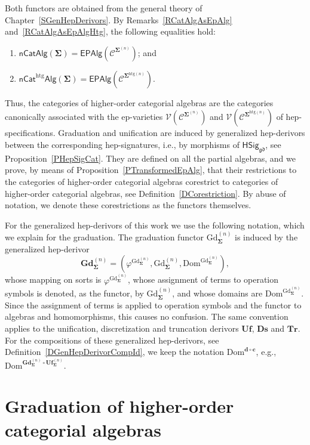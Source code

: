 \documentclass[a4paper, reqno]{amsbook}
\newcommand{\sig}[1]{\mathbf{#1}}             %
\newcommand{\spec}[1]{\boldsymbol{\mathcal{#1}}} %
\newcommand{\Dom}{\mathrm{Dom}}
\newcommand{\gd}{\mathfrak{gd}}              %
\newcommand{\htg}{\mathrm{htg}}                %
\newcommand{\Gd}{\mathrm{Gd}}
\newcommand{\bGd}{\mathbf{Gd}}
\newcommand{\bUf}{\mathbf{Uf}}
\newcommand{\bDs}{\mathbf{Ds}}
\newcommand{\bTr}{\mathbf{Tr}}
\theoremstyle{plain}
\theoremstyle{definition}
\begin{document}
Both functors are obtained from the general theory of Chapter~\ref{SGenHepDerivors}.
By Remarks~\ref{RCatAlgAsEpAlg} and~\ref{RCatAlgAsEpAlgHtg}, the following equalities hold:
\begin{enumerate}
	\item
	$\mathsf{nCatAlg}(\sig{\Sigma})=\mathsf{EPAlg}(\spec{C}^{\sig{\Sigma}^{(n)}})$; and

	\item
	$\mathsf{nCat}^{\htg}\mathsf{Alg}(\sig{\Sigma})=\mathsf{EPAlg}(\spec{C}^{\sig{\Sigma}^{\htg(n)}})$.
\end{enumerate}
Thus, the categories of higher-order categorial algebras are the categories canonically associated with the ep-varieties $\mathcal{V}(\spec{C}^{\sig{\Sigma}^{(n)}})$ and $\mathcal{V}(\spec{C}^{\sig{\Sigma}^{\htg(n)}})$ of hep-specifications.
Graduation and unification are induced by generalized hep-derivors between the corresponding hep-signatures, i.e., by morphisms of $\mathsf{HSig}_{\gd}$, see Proposition~\ref{PHepSigCat}.
They are defined on all the partial algebras, and we prove, by means of Proposition~\ref{PTransformedEpAlg}, that their restrictions to the categories of higher-order categorial algebras corestrict to categories of higher-order categorial algebras, see Definition~\ref{DCorestriction}.
By abuse of notation, we denote these corestrictions as the functors themselves.

For the generalized hep-derivors of this work we use the following notation, which we explain for the graduation.
The graduation functor $\Gd^{(n)}_{\sig{\Sigma}}$ is induced by the generalized hep-derivor
$$
\bGd^{(n)}_{\sig{\Sigma}}=\left(\varphi^{\Gd^{(n)}_{\sig{\Sigma}}},\Gd^{(n)}_{\sig{\Sigma}},\Dom^{\Gd^{(n)}_{\sig{\Sigma}}}\right),
$$
whose mapping on sorts is $\varphi^{\Gd^{(n)}_{\sig{\Sigma}}}$, whose assignment of terms to operation symbols is denoted, as the functor, by $\Gd^{(n)}_{\sig{\Sigma}}$, and whose domains are $\Dom^{\Gd^{(n)}_{\sig{\Sigma}}}$.
Since the assignment of terms is applied to operation symbols and the functor to algebras and homomorphisms, this causes no confusion.
The same convention applies to the unification, discretization and truncation derivors $\bUf$, $\bDs$ and $\bTr$.
For the compositions of these generalized hep-derivors, see Definition~\ref{DGenHepDerivorCompId}, we keep the notation $\Dom^{\mathbf{d}\circ\mathbf{c}}$, e.g., $\Dom^{\bGd^{(n)}_{\sig{\Sigma}}\circ\bUf^{(n)}_{\sig{\Sigma}}}$.

\section{Graduation of higher-order categorial algebras}\label{SGd}
\end{document}
